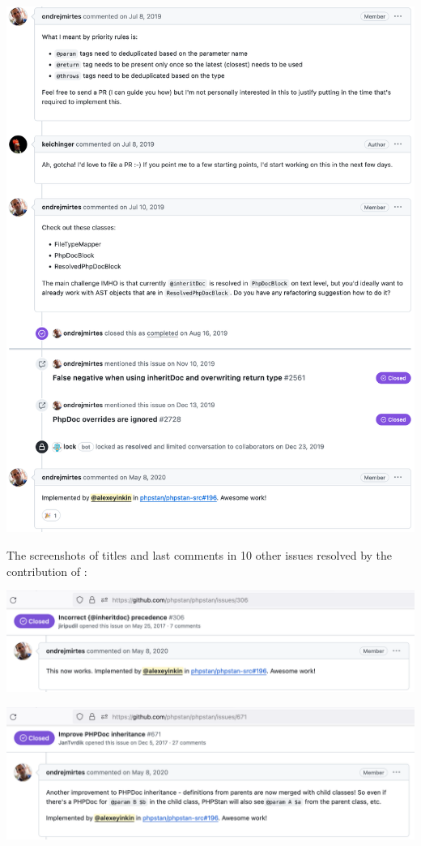 \Continuing
\begin{center}
    \includegraphics[width=37em]{issue-2281-full-p3}
\end{center}
\pagebreak

The screenshots of titles and last comments in 10 other issues
resolved by the contribution of \mrl:

\includegraphics[width=\textwidth]{issue-306}

\includegraphics[width=\textwidth]{issue-671}

